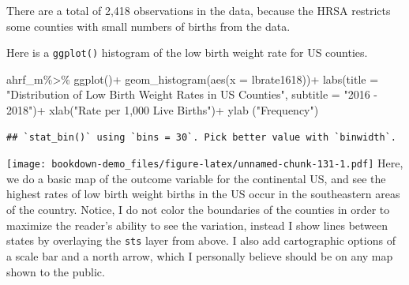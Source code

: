 \documentclass[
]{article}
\newenvironment{Shaded}{\begin{snugshade}}{\end{snugshade}}
\newcommand{\AttributeTok}[1]{\textcolor[rgb]{0.77,0.63,0.00}{#1}}
\newcommand{\FunctionTok}[1]{\textcolor[rgb]{0.00,0.00,0.00}{#1}}
\newcommand{\NormalTok}[1]{#1}
\newcommand{\SpecialCharTok}[1]{\textcolor[rgb]{0.00,0.00,0.00}{#1}}
\newcommand{\StringTok}[1]{\textcolor[rgb]{0.31,0.60,0.02}{#1}}
\begin{document}
There are a total of 2,418 observations in the data, because the HRSA restricts some counties with small numbers of births from the data.

Here is a \texttt{ggplot()} histogram of the low birth weight rate for US counties.

\begin{Shaded}
\begin{Highlighting}[]
\NormalTok{ahrf\_m}\SpecialCharTok{\%\textgreater{}\%}
  \FunctionTok{ggplot}\NormalTok{()}\SpecialCharTok{+}
  \FunctionTok{geom\_histogram}\NormalTok{(}\FunctionTok{aes}\NormalTok{(}\AttributeTok{x =}\NormalTok{ lbrate1618))}\SpecialCharTok{+}
  \FunctionTok{labs}\NormalTok{(}\AttributeTok{title =} \StringTok{"Distribution of Low Birth Weight Rates in US Counties"}\NormalTok{,}
       \AttributeTok{subtitle =} \StringTok{"2016 {-} 2018"}\NormalTok{)}\SpecialCharTok{+}
       \FunctionTok{xlab}\NormalTok{(}\StringTok{"Rate per 1,000 Live Births"}\NormalTok{)}\SpecialCharTok{+}
  \FunctionTok{ylab}\NormalTok{ (}\StringTok{"Frequency"}\NormalTok{)}
\end{Highlighting}
\end{Shaded}

\begin{verbatim}
## `stat_bin()` using `bins = 30`. Pick better value with `binwidth`.
\end{verbatim}

\texttt{[image: bookdown-demo\_files/figure-latex/unnamed-chunk-131-1.pdf]}
Here, we do a basic map of the outcome variable for the continental US, and see the highest rates of low birth weight births in the US occur in the southeastern areas of the country. Notice, I do not color the boundaries of the counties in order to maximize the reader's ability to see the variation, instead I show lines between states by overlaying the \texttt{sts} layer from above. I also add cartographic options of a scale bar and a north arrow, which I personally believe should be on any map shown to the public.
\end{document}

